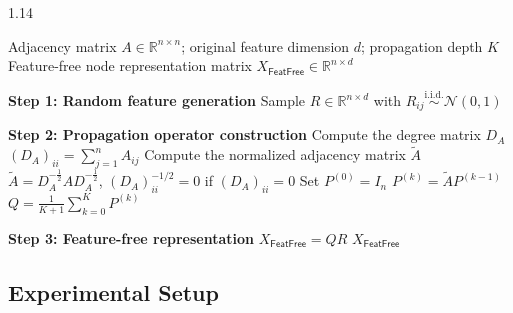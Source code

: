 \documentclass[conference,compsoc]{IEEEtran}
\theoremstyle{boldplain}
\theoremstyle{bolddefinition}
\theoremstyle{remark}
\newcommand{\ff}{\ensuremath{\mathsf{FeatFree}}\xspace}
\begin{document}
\begin{algorithm}[!t]
    \caption{Construction of \ff}
    \label{alg:feature_free_baseline}
    \renewcommand{\algorithmicrequire}{\textbf{Input:}}
    \renewcommand{\algorithmicensure}{\textbf{Output:}}
    \begin{spacing}{1.14}
    \begin{algorithmic}[1]
        \REQUIRE Adjacency matrix $A\in\mathbb{R}^{n\times n}$; original feature dimension $d$; propagation depth $K$
        \ENSURE Feature-free node representation matrix $X_{\ff}\in\mathbb{R}^{n\times d}$

        \STATE \textbf{Step 1: Random feature generation}
        \STATE Sample $R\in\mathbb{R}^{n\times d}$ with $R_{ij}\overset{\mathrm{i.i.d.}}{\sim}\mathcal{N}(0,1)$

        \STATE \textbf{Step 2: Propagation operator construction}
        \STATE Compute the degree matrix $D_A$
        \STATE $(D_A)_{ii}=\sum_{j=1}^{n}A_{ij}$
        \STATE Compute the normalized adjacency matrix $\widetilde A$
        \STATE $\widetilde A=D_A^{-\frac{1}{2}}AD_A^{-\frac{1}{2}}$, $(D_A)_{ii}^{-1/2}=0$ if $(D_A)_{ii}=0$
        \STATE Set $P^{(0)}=I_n$
            \STATE $P^{(k)}=\widetilde A P^{(k-1)}$
        \ENDFOR
        \STATE $Q=\frac{1}{K+1}\sum_{k=0}^{K}P^{(k)}$

        \STATE \textbf{Step 3: Feature-free representation}
        \STATE $X_{\ff}=QR$
        \RETURN $X_{\ff}$
    \end{algorithmic}
    \end{spacing}
\end{algorithm}


\subsection{Experimental Setup}
\label{sec:experimental_setup}
\end{document}
